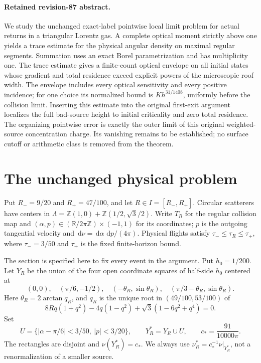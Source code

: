 \documentclass[11pt,reqno]{amsart}
\numberwithin{equation}{section}
\theoremstyle{definition}\newtheorem{definition}[theorem]{Definition}
\theoremstyle{remark}\newtheorem{remark}[theorem]{Remark}
\newcommand{\R}{\mathbb R}\newcommand{\Z}{\mathbb Z}\newcommand{\T}{\mathbb T}
\newcommand{\dd}{\,\mathrm d}\newcommand{\one}{\mathbf1}
\theoremstyle{definition}\newtheorem{inputstatement}[theorem]{Input statement}
\begin{document}
\paragraph{Retained revision-87 abstract.}

We study the unchanged exact-label pointwise local limit problem for
actual returns in a triangular Lorentz gas. A complete optical moment
strictly above one yields a trace estimate for the physical angular
density on maximal regular segments. Summation uses an exact Borel
parametrization and has multiplicity one. The trace estimate gives a
finite-count optical envelope on all initial states whose gradient and
total residence exceed explicit powers of the microscopic roof width.
The envelope includes every optical sensitivity and every positive
incidence; for one choice its normalized bound is $K h^{31/1408}$,
uniformly before the collision limit. Inserting this estimate into the
original first-exit argument localizes the full bad-source height to
initial criticality and zero total residence. The organizing pointwise
error is exactly the outer limit of this original weighted-source
concentration charge. Its vanishing remains to be established; no
surface cutoff or arithmetic class is removed from the theorem.



\section{The unchanged physical problem}
Put $R_-=9/20$ and $R_+=47/100$, and let $R\in I=[R_-,R_+]$. Circular scatterers have centers in
$\Lambda=\Z(1,0)+\Z(1/2,\sqrt3/2)$. Write $T_R$ for the regular
collision map and $(\alpha,p)\in(\R/2\pi\Z)\times(-1,1)$ for its
coordinates; $p$ is the outgoing tangential velocity and
$\dd\nu=\dd\alpha\,\dd p/(4\pi)$. Physical flights satisfy
$\tau_-\le\tau_R\le\tau_+$, where $\tau_-=3/50$ and $\tau_+$
is the fixed finite-horizon bound.

The section is specified here to fix every event in the argument.
Put $h_0=1/200$. Let $Y_R$ be the union of the four open coordinate
squares of half-side $h_0$ centered at
\[
 (0,0),\quad(\pi/6,-1/2),\quad
 (-\theta_R,\sin\theta_R),\quad
 (\pi/3-\theta_R,\sin\theta_R).
\]
Here $\theta_R=2\arctan q_R$, and $q_R$ is the unique root in
$(49/100,53/100)$ of
\[
 8Rq(1+q^2)-4q(1-q^2)+\sqrt3(1-6q^2+q^4)=0.
\]
Set
\[
 U=\{|\alpha-\pi/6|<3/50,\ |p|<3/20\},\qquad
 Y_R^*=Y_R\cup U,\qquad c_*=\frac{91}{10000\pi}.
\]
The rectangles are disjoint and $\nu(Y_R^*)=c_*$. We always use
$\nu_R^*=c_*^{-1}\nu|_{Y_R^*}$, not a renormalization of a smaller
source.
\end{document}
